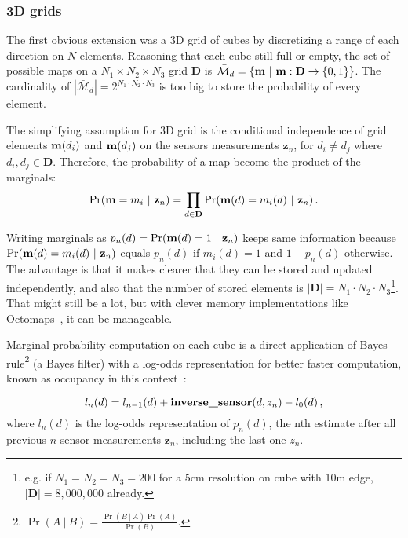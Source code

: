 \subsubsection{3D grids}
\label{sss:3dgrid}
The first obvious extension was a 3D grid of cubes by discretizing a range
of each direction on $N$ elements. Reasoning that each cube still full
or empty, the set of possible maps on a $N_1\times N_2\times
N_3$ grid $\mathbf{D}$ is
$\bar{\mathcal{M}}_d=\{\mathrm{\mathbf{m}}~|~\mathrm{\mathbf{m}}:\mathbf{D}\to\{0,1\}\}$. The
cardinality of $|\bar{\mathcal{M}}_d|=2^{N_1\cdot N_2\cdot
N_3}$ is too big to store the probability of every element. 

The simplifying assumption for 3D grid is the conditional independence of grid
elements $\mathrm{\mathbf{m}}(d_i)$ and $\mathrm{\mathbf{m}}(d_j)$ on the sensors measurements
$\mathbf{z}_n$, for $d_i\neq d_j$ where  $d_i, d_j \in \mathbf{D}$.
Therefore, the probability of a map become the product of the marginals:
\begin{equation*}
\Pr(\mathrm{\mathbf{m}}=m_i~|~\mathbf{z}_n)=\prod_{d\in\mathbf{D}}\Pr(\mathrm{\mathbf{m}}(d)=m_i(d)~|~\mathbf{z}_n)\,.
\end{equation*}

Writing marginals as $p_n(d) = \Pr(\mathrm{\mathbf{m}}(d)=1~|~\mathbf{z}_n)$ keeps same
information because $\Pr(\mathrm{\mathbf{m}}(d)=m_i(d)~|~\mathbf{z}_n)$ equals $p_n(d)$ if
$m_i(d)=1$ and $1-p_n(d)$ otherwise. The advantage is that it makes clearer that
they can be stored and updated independently, and also that the number of stored
elements is $|\mathbf{D}|=N_1\cdot N_2\cdot N_3$\footnote{e.g. if
$N_1=N_2=N_3=200$ for a 5cm resolution on cube with 10m edge,
$|\mathbf{D}|=8,000,000$ already.}.
That might still be a lot, but with clever memory implementations like
Octomaps~\cite{hornung2013octomap}, it can be manageable.

Marginal probability computation on each cube is a direct application of Bayes
rule\footnote{$\Pr(A~|~B)=\frac{\Pr(B~|~A)\Pr(A)}{\Pr(B)}$.} (a Bayes filter)
with a log-odds representation for better faster
computation, known as occupancy in this context~\cite{thrunprob}:

\begin{equation}
\label{eq:gridoccupancy}
l_n(d) = l_{n-1}(d)+ \text{\textbf{inverse\_sensor}}(d,z_n) - l_0(d)\,,
\end{equation}
%
where $l_n(d)$ is the log-odds representation of $p_n(d)$, the nth estimate
after all previous $n$ sensor measurements $\mathbf{z}_n$, including the last one
$z_n$.


